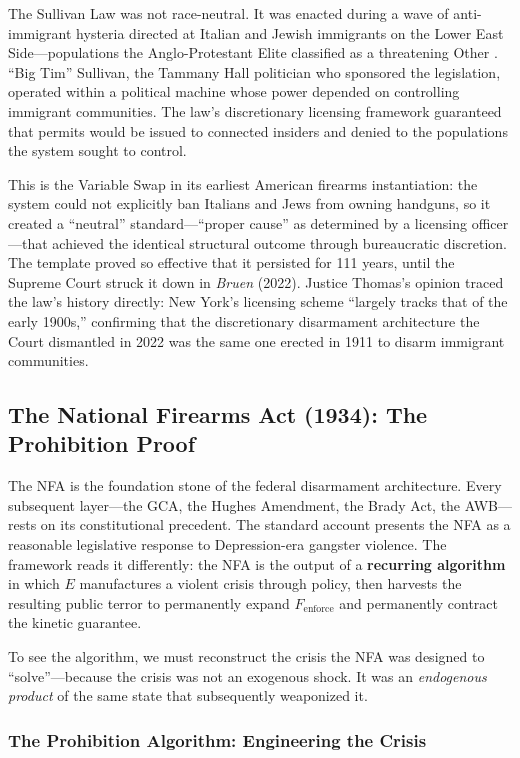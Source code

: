 \documentclass[12pt,openany]{book}
\begin{document}
The Sullivan Law was not race-neutral. It was enacted during a wave of anti-immigrant hysteria directed at Italian and Jewish immigrants on the Lower East Side---populations the Anglo-Protestant Elite classified as a threatening Other \cite{winkler2011}. ``Big Tim'' Sullivan, the Tammany Hall politician who sponsored the legislation, operated within a political machine whose power depended on controlling immigrant communities. The law's discretionary licensing framework guaranteed that permits would be issued to connected insiders and denied to the populations the system sought to control.

This is the Variable Swap in its earliest American firearms instantiation: the system could not explicitly ban Italians and Jews from owning handguns, so it created a ``neutral'' standard---``proper cause'' as determined by a licensing officer---that achieved the identical structural outcome through bureaucratic discretion. The template proved so effective that it persisted for 111 years, until the Supreme Court struck it down in \textit{Bruen} (2022). Justice Thomas's opinion traced the law's history directly: New York's licensing scheme ``largely tracks that of the early 1900s,'' confirming that the discretionary disarmament architecture the Court dismantled in 2022 was the same one erected in 1911 to disarm immigrant communities.

\subsection{The National Firearms Act (1934): The Prohibition Proof}

The NFA is the foundation stone of the federal disarmament architecture. Every subsequent layer---the GCA, the Hughes Amendment, the Brady Act, the AWB---rests on its constitutional precedent. The standard account presents the NFA as a reasonable legislative response to Depression-era gangster violence. The framework reads it differently: the NFA is the output of a \textbf{recurring algorithm} in which $E$ manufactures a violent crisis through policy, then harvests the resulting public terror to permanently expand $F_{\text{enforce}}$ and permanently contract the kinetic guarantee.

To see the algorithm, we must reconstruct the crisis the NFA was designed to ``solve''---because the crisis was not an exogenous shock. It was an \textit{endogenous product} of the same state that subsequently weaponized it.

\subsubsection{The Prohibition Algorithm: Engineering the Crisis}
\end{document}
